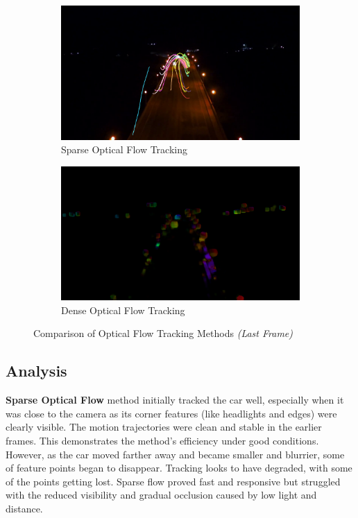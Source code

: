 \documentclass[12pt,a4paper]{article}
\begin{document}
\begin{figure}[htb]
    \centering
    \begin{subfigure}[b]{0.48\textwidth}
        \centering
        \includegraphics[width=\textwidth]{src/sparse_last_frame.png}
        \caption{Sparse Optical Flow Tracking}
    \end{subfigure}
    \hfill
    \begin{subfigure}[b]{0.48\textwidth}
        \centering
        \includegraphics[width=\textwidth]{src/dense_last_frame.png}
        \caption{Dense Optical Flow Tracking}
    \end{subfigure}
    \caption{Comparison of Optical Flow Tracking Methods \textit{(Last Frame)}}
\end{figure}

\subsection{Analysis}
\textbf{Sparse Optical Flow} method initially tracked the car well, especially when it was close to the camera as its corner features (like headlights and edges) were 
clearly visible. The motion trajectories were clean and stable in the earlier frames. This demonstrates the method's efficiency under good conditions. 
However, as the car moved farther away and became smaller and blurrier, some of feature points began to disappear. Tracking looks to have degraded, 
with some of the points getting lost. Sparse flow proved fast and responsive but struggled with the reduced visibility and gradual occlusion caused 
by low light and distance.
\end{document}
